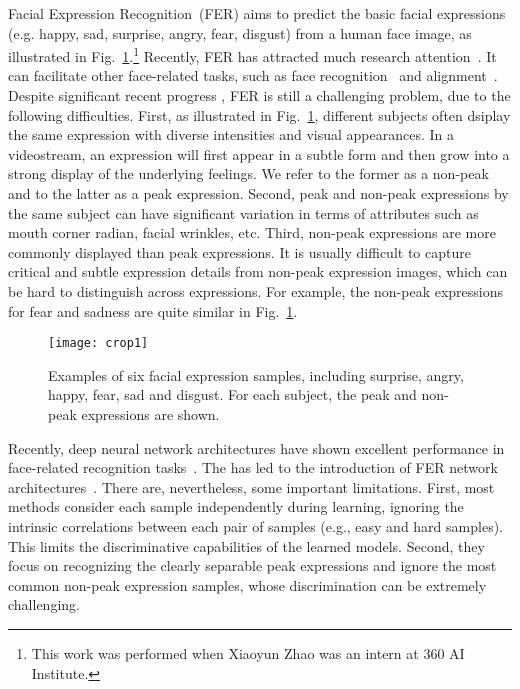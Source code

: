 \documentclass[runningheads]{llncs}
\begin{document}
Facial Expression Recognition~(FER) aims to predict the basic facial 
expressions (e.g. happy, sad, surprise, angry, fear, disgust) from a human 
face image, as illustrated in Fig.~\ref{fig:expression}.\footnote{This work was performed when Xiaoyun Zhao was an intern at 360 AI Institute.}
 Recently, FER has 
attracted much research 
attention~\cite{liu2014learning,chen20153d,dapogny2015pairwise,liu2014facial,yu2015image,liu2013aware,jung2015joint}. It can facilitate other face-related tasks, such as face 
recognition~\cite{li2006expression} and alignment~\cite{zhang2014facial}. 
Despite significant recent progress
\cite{zhong2012learning,shan2009facial,liu2014facial,kahou2014facial}, FER 
is still a challenging problem, due to the following 
difficulties. First, as illustrated 
in Fig.~\ref{fig:expression}, different subjects often dsiplay the same 
expression with diverse intensities and visual appearances. In
a videostream, an expression will first appear in a subtle form 
and then grow into a strong display of the underlying feelings. 
We refer to the former as a non-peak and to the latter as a peak expression. 
Second, peak and non-peak expressions by the same subject can have 
significant variation in terms of attributes such as mouth corner radian, 
facial wrinkles, etc. 
Third, non-peak expressions are more commonly displayed than peak 
expressions. It is usually difficult to capture critical and subtle
expression details from non-peak expression images, which can be hard to 
distinguish across expressions. For example, the non-peak expressions for fear 
and sadness are quite similar in Fig.~\ref{fig:expression}.

\begin{figure}
	\centering
	\texttt{[image: crop1]}
	\caption{Examples of six facial expression samples, including surprise, angry, happy, fear, sad and disgust. For each subject, the peak and non-peak expressions are shown. }
	\label{fig:expression}
\end{figure}



Recently, deep neural network
architectures have shown excellent performance in face-related recognition 
tasks~\cite{chopra2005learning,lai2015deep,li2015convolutional}. The has
led to the introduction of FER network 
architectures~\cite{liu2014facial,mollahosseini2015going}. There are, nevertheless, some important limitations. First,
most methods consider each sample independently during learning,
ignoring the intrinsic correlations between each pair of samples (e.g., easy 
and hard samples). This limits the discriminative capabilities of the learned 
models. Second, they focus on recognizing the clearly separable peak 
expressions and ignore the most common non-peak expression samples, whose
discrimination can be extremely challenging.
\end{document}
